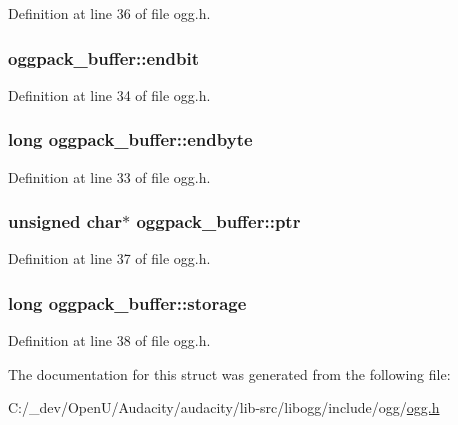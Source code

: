 Definition at line 36 of file ogg.\+h.

\subsubsection[{\texorpdfstring{endbit}{endbit}}]{ oggpack\+\_\+buffer\+::endbit}\hypertarget{structoggpack__buffer_a5a2ecb260025f73201e58dbd621c9f8b}{}\label{structoggpack__buffer_a5a2ecb260025f73201e58dbd621c9f8b}


Definition at line 34 of file ogg.\+h.

\subsubsection[{\texorpdfstring{endbyte}{endbyte}}]{\setlength{\rightskip}{0pt plus 5cm}long oggpack\+\_\+buffer\+::endbyte}\hypertarget{structoggpack__buffer_a416200dd77da3603dce3913826d74207}{}\label{structoggpack__buffer_a416200dd77da3603dce3913826d74207}


Definition at line 33 of file ogg.\+h.

\subsubsection[{\texorpdfstring{ptr}{ptr}}]{\setlength{\rightskip}{0pt plus 5cm}unsigned char$\ast$ oggpack\+\_\+buffer\+::ptr}\hypertarget{structoggpack__buffer_a479984d9646e0fba6da8aff21e5c3b64}{}\label{structoggpack__buffer_a479984d9646e0fba6da8aff21e5c3b64}


Definition at line 37 of file ogg.\+h.

\subsubsection[{\texorpdfstring{storage}{storage}}]{\setlength{\rightskip}{0pt plus 5cm}long oggpack\+\_\+buffer\+::storage}\hypertarget{structoggpack__buffer_a1eea2afb662c8080a902d224773fee4e}{}\label{structoggpack__buffer_a1eea2afb662c8080a902d224773fee4e}


Definition at line 38 of file ogg.\+h.



The documentation for this struct was generated from the following file\+:\begin{DoxyCompactItemize}
\item 
C\+:/\+\_\+dev/\+Open\+U/\+Audacity/audacity/lib-\/src/libogg/include/ogg/\hyperlink{ogg_8h}{ogg.\+h}\end{DoxyCompactItemize}
